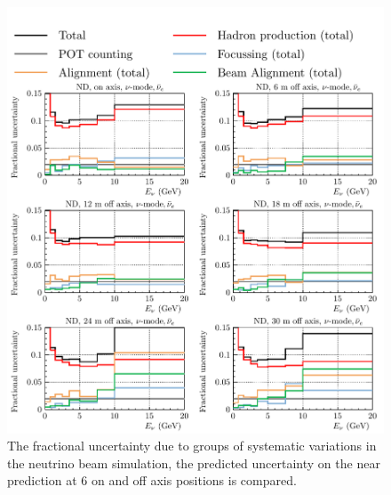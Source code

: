 \documentclass{article}
\begin{document}
\begin{figure}
  \centering
  \includegraphics[width=\textwidth]{plots/fracerrs/numode_nuebar_ErrType_OffAxis}
  \caption{The fractional uncertainty due to groups of systematic variations in the neutrino beam simulation, the predicted uncertainty on the near prediction at 6 on and off axis positions is compared.}
  \label{fig:grp_nu_nuebar_offaxis}
\end{figure}
\end{document}
